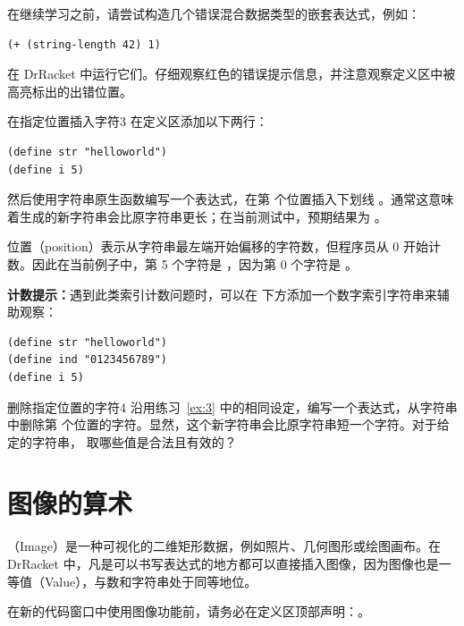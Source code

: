 在继续学习之前，请尝试构造几个错误混合数据类型的嵌套表达式，例如：
\begin{lstlisting}[language=BSL]
(+ (string-length 42) 1)
\end{lstlisting}
在 DrRacket 中运行它们。仔细观察红色的错误提示信息，并注意观察定义区中被高亮标出的出错位置。

\begin{exercise}{在指定位置插入字符}{3}
在定义区添加以下两行：
\begin{lstlisting}[language=BSL]
(define str "helloworld")
(define i 5)
\end{lstlisting}

然后使用字符串原生函数编写一个表达式，在第  个位置插入下划线 。通常这意味着生成的新字符串会比原字符串更长；在当前测试中，预期结果为 。

位置（position）表示从字符串最左端开始偏移的字符数，但程序员从 0 开始计数。因此在当前例子中，第 5 个字符是 ，因为第 0 个字符是 。

\textbf{计数提示：}遇到此类索引计数问题时，可以在  下方添加一个数字索引字符串来辅助观察：
\begin{lstlisting}[language=BSL]
(define str "helloworld")
(define ind "0123456789")
(define i 5)
\end{lstlisting}
\end{exercise}

\begin{exercise}{删除指定位置的字符}{4}
沿用练习~\ref{ex:3} 中的相同设定，编写一个表达式，从字符串  中删除第  个位置的字符。显然，这个新字符串会比原字符串短一个字符。对于给定的字符串， 取哪些值是合法且有效的？
\end{exercise}


\section{图像的算术}
\label{sec:1.4}

（Image）是一种可视化的二维矩形数据，例如照片、几何图形或绘图画布。在 DrRacket 中，凡是可以书写表达式的地方都可以直接插入图像，因为图像也是一等值（Value），与数和字符串处于同等地位。

\begin{notebox}[图像库引入]
在新的代码窗口中使用图像功能前，请务必在定义区顶部声明：。
\end{notebox}

